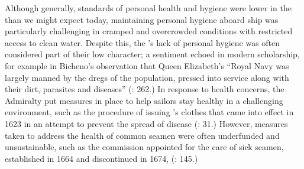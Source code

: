 Although generally, standards of personal health and hygiene were lower in the  than we might expect today, maintaining personal hygiene aboard ship was particularly challenging in cramped and overcrowded conditions with restricted access to clean water. Despite this, the ’s lack of personal hygiene was often considered part of their low character; a sentiment echoed in modern scholarship, for example in Bicheno’s observation that Queen Elizabeth’s “Royal Navy was largely manned by the dregs of the population, pressed into service along with their dirt, parasites and diseases” (\citeyear*{Bicheno2012}: 262.) In response to health concerns, the Admiralty put measures in place to help sailors stay healthy in a challenging environment, such as the procedure of issuing ’s clothes that came into effect in 1623 in an attempt to prevent the spread of disease (\citealt{Brown2011}: 31.) However, measures taken to address the health of common seamen were often underfunded and unsustainable, such as the commission appointed for the care of sick seamen, established in 1664 and discontinued in 1674, (\citealt{Lincoln2015}: 145.)

